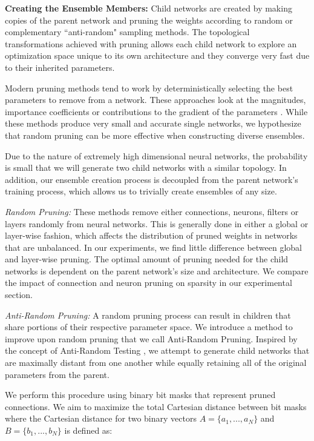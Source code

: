 \documentclass[letterpaper]{article} %
\begin{document}
\textbf{Creating the Ensemble Members:} Child networks are created by making copies of the parent network and pruning the weights according to random or complementary ``anti-random" sampling methods. 
The topological transformations achieved with pruning allows each child network to explore an optimization space unique to its own architecture and they converge very fast due to their inherited parameters.

Modern pruning methods tend to work by deterministically selecting the best parameters to remove from a network. These approaches look at the magnitudes, importance coefficients or contributions to the gradient of the parameters \cite{blalock2020state, janowski1989pruning, lecun1990optimal, lee2019snip, frankle2019lottery}. While these methods produce very small and accurate single networks, we hypothesize that random pruning can be more effective when constructing diverse ensembles.

Due to the nature of extremely high dimensional neural networks, the probability is small that we will generate two child networks with a similar topology. In addition, our ensemble creation process is decoupled from the parent network's training process, which allows us to trivially create ensembles of any size.

\textit{Random Pruning:} These methods remove either connections, neurons, filters or layers randomly from neural networks. This is generally done in either a global or layer-wise fashion, which affects the distribution of pruned weights in networks that are unbalanced. In our experiments, we find little difference between global and layer-wise pruning. The optimal amount of pruning needed for the child networks is dependent on the parent network's size and architecture. We compare the impact of connection and neuron pruning on sparsity in our experimental section.

\textit{Anti-Random Pruning:}  A random pruning process can result in children that share portions of their respective parameter space. We introduce a method to improve upon random pruning that we call Anti-Random Pruning. Inspired by the concept of Anti-Random Testing \cite{malaiya1995antirandom}, we attempt to generate child networks that are maximally distant from one another while equally retaining all of the original parameters from the parent.

We perform this procedure using binary bit masks that represent pruned connections. We aim to maximize the total 
Cartesian distance between bit masks where the Cartesian distance for two binary vectors $A = \{a_1, ..., a_N\}$ and $B = \{b_1, ..., b_N\}$ is defined as:
\end{document}
